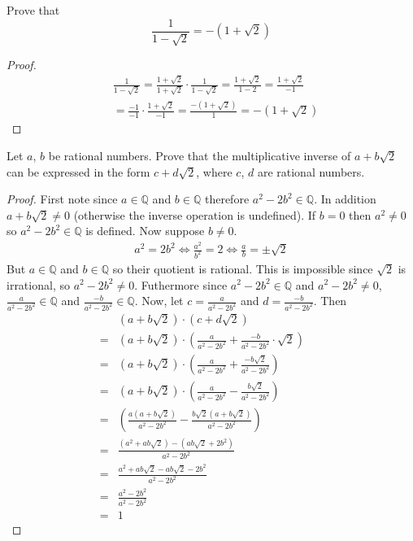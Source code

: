 \documentclass[6pt]{article}
\begin{document}
\begin{tcolorbox}[title=Problem 5, breakable]
    Prove that 
    \[\frac{1}{1 - \sqrt{2}} = -(1 + \sqrt{2})\]
\end{tcolorbox}

\begin{proof}
    \begin{align*}
        &\frac{1}{1 - \sqrt{2}}
        = \frac{1 + \sqrt{2}}{1 + \sqrt{2}} \cdot \frac{1}{1 - \sqrt{2}}
        = \frac{1 + \sqrt{2}}{1 - 2}
        = \frac{1 + \sqrt{2}}{-1} \\
        &= \frac{-1}{-1} \cdot \frac{1 + \sqrt{2}}{-1} 
        = \frac{-(1 + \sqrt{2})}{1}
        = -(1 + \sqrt{2}) 
    \end{align*}
\end{proof}

\begin{tcolorbox}[title=Problem 8, breakable]
    Let $a$, $b$ be rational numbers. Prove that the multiplicative inverse of 
    $a + b\sqrt{2}$ can be expressed in the form $c + d\sqrt{2}$, where $c$, $d$
    are rational numbers.
\end{tcolorbox}

\begin{proof}
    First note since $a \in \mathbb{Q}$ and $b \in \mathbb{Q}$ therefore $a^2 - 2b^2 \in \mathbb{Q}$.
    In addition $a + b\sqrt{2} \not = 0$ (otherwise the inverse operation is undefined).
    If $b = 0$ then $a^2 \not = 0$ so $a^2 - 2b^2 \in \mathbb{Q}$ is defined.
    Now suppose $b \not = 0$.
    \begin{align*}
        a^2 = 2b^2 \iff \frac{a^2}{b^2} = 2 \iff \frac{a}{b} = \pm \sqrt{2}
    \end{align*}
    But $a \in \mathbb{Q}$ and $b \in \mathbb{Q}$ so their quotient is rational.
    This is impossible since $\sqrt{2}$ is irrational, so $a^2 - 2b^2 \neq 0$.
    Futhermore since $a^2 - 2b^2 \in \mathbb{Q}$ and $a^2 - 2b^2 \not = 0$,
        $\frac{a}{a^2 - 2b^2} \in \mathbb{Q}$ and $\frac{-b}{a^2 - 2b^2} \in \mathbb{Q}$.
    Now, let $c = \frac{a}{a^2 - 2b^2}$ and $d = \frac{-b}{a^2 - 2b^2}$.
    Then
    \begin{align*}
        & (a + b\sqrt{2}) \cdot (c + d\sqrt{2}) && \\
        = &(a + b\sqrt{2}) \cdot \left(\frac{a}{a^2 - 2b^2} + \frac{-b}{a^2 - 2b^2} \cdot \sqrt{2}\right) && \\
        = &(a + b\sqrt{2}) \cdot \left(\frac{a}{a^2 - 2b^2} + \frac{-b\sqrt{2}}{a^2 - 2b^2}\right) && \\
        = &(a + b\sqrt{2}) \cdot \left(\frac{a}{a^2 - 2b^2} - \frac{b\sqrt{2}}{a^2 - 2b^2}\right) && \\
        = &\left(\frac{a(a + b\sqrt{2})}{a^2 - 2b^2} - \frac{b\sqrt{2}(a + b\sqrt{2})}{a^2 - 2b^2}\right) && \\
        = &\frac{(a^2 + ab\sqrt{2}) - (ab\sqrt{2} + 2b^2)}{a^2 - 2b^2} && \\
        = &\frac{a^2 + ab\sqrt{2} - ab\sqrt{2} - 2b^2}{a^2 - 2b^2} && \\
        = &\frac{a^2 - 2b^2}{a^2 - 2b^2} && \\
        = &1
    \end{align*}
\end{proof}
\end{document}
